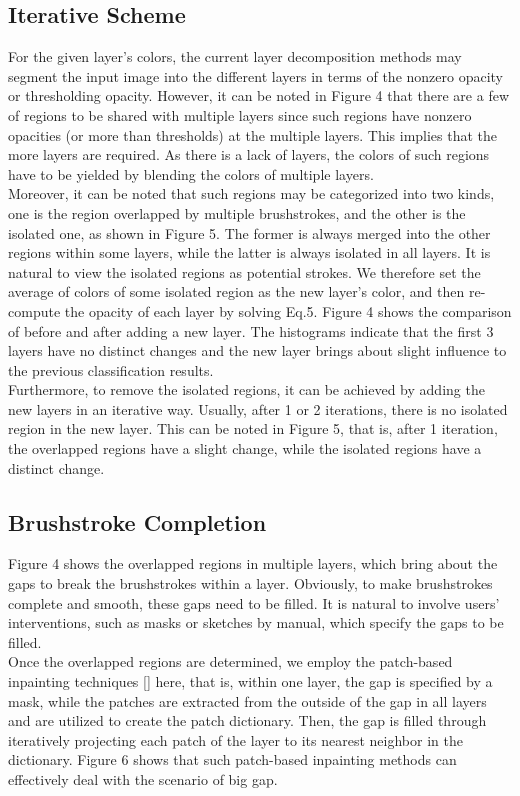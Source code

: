\subsection{Iterative Scheme}
For the given layer’s colors, the current layer decomposition methods may segment the input image into the different layers in terms of the nonzero opacity or thresholding opacity. However, it can be noted in Figure 4 that there are a few of regions to be shared with multiple layers since such regions have nonzero opacities (or more than thresholds) at the multiple layers. This implies that the more layers are required. As there is a lack of layers, the colors of such regions have to be yielded by blending the colors of multiple layers.\\
Moreover, it can be noted that such regions may be categorized into two kinds, one is the region overlapped by multiple brushstrokes, and the other is the isolated one, as shown in Figure 5. The former is always merged into the other regions within some layers, while the latter is always isolated in all layers. It is natural to view the isolated regions as potential strokes. We therefore set the average of colors of some isolated region as the new layer’s color, and then re-compute the opacity of each layer by solving Eq.5. Figure 4 shows the comparison of before and after adding a new layer. The histograms indicate that the first 3 layers have no distinct changes and the new layer brings about slight influence to the previous classification results.\\
Furthermore, to remove the isolated regions, it can be achieved by adding the new layers in an iterative way. Usually, after 1 or 2 iterations, there is no isolated region in the new layer. This can be noted in Figure 5, that is, after 1 iteration, the overlapped regions have a slight change, while the isolated regions have a distinct change.
\subsection{Brushstroke Completion}
Figure 4 shows the overlapped regions in multiple layers, which bring about the gaps to break the brushstrokes within a layer. Obviously, to make brushstrokes complete and smooth, these gaps need to be filled. It is natural to involve users’ interventions, such as masks or sketches by manual, which specify the gaps to be filled.\\
Once the overlapped regions are determined, we employ the patch-based inpainting techniques [] here, that is, within one layer, the gap is specified by a mask, while the patches are extracted from the outside of the gap in all layers and are utilized to create the patch dictionary. Then, the gap is filled through iteratively projecting each patch of the layer to its nearest neighbor in the dictionary. Figure 6 shows that such patch-based inpainting methods can effectively deal with the scenario of big gap.
